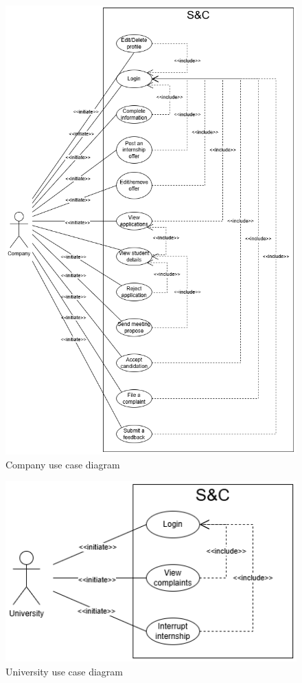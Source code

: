 \begin{figure}[H]
    \centering
    \includegraphics[width=0.9\linewidth]{Images/use case diagrams/COMPANY.png}
    \caption{Company use case diagram}
    \label{fig:enter-label}
\end{figure}

\begin{figure}[H]
    \centering
    \includegraphics[width=1\linewidth]{Images/use case diagrams/UNIVERSITY.png}
    \caption{University use case diagram}
    \label{fig:enter-label}
\end{figure}

